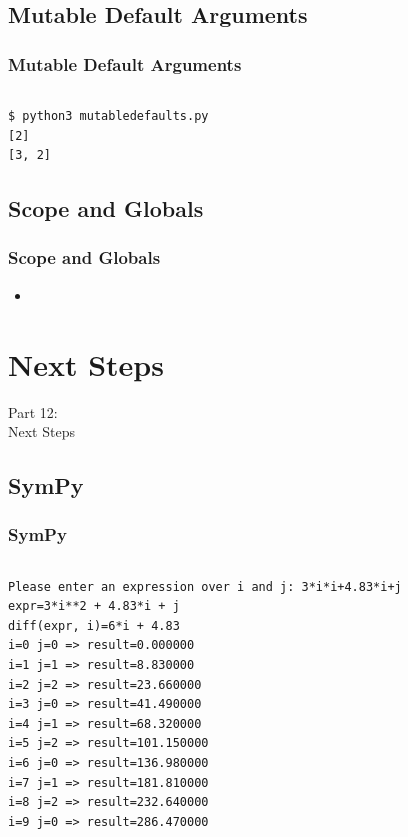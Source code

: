 \subsection{Mutable Default Arguments}
\begin{frame}[fragile]
    \frametitle{Mutable Default Arguments}
    \vspace{3mm}
    \inputminted[fontsize=\normalsize]{python}{../src/mutabledefaults.py}
    \pause
    \vspace{5mm}
    \begin{verbatim}
$ python3 mutabledefaults.py 
[2]
[3, 2]
    \end{verbatim}
\end{frame}

\subsection{Scope and Globals}
\begin{frame}
    \frametitle{Scope and Globals}
    \vspace{5mm}
    
    \begin{itemize}
      \item 
    \end{itemize}
\end{frame}


\section{Next Steps}
\begin{frame}
    \vspace{25mm}
    \begin{center}
        \Huge{Part 12:\\Next Steps}
    \end{center}
\end{frame}

\subsection{SymPy}
\begin{frame}[fragile]
    \frametitle{SymPy}
    \vspace{2mm}
    \inputminted[fontsize=\tiny]{python}{../src/sympyexample.py}
    \pause
    \vspace{5mm}
    
    {\tiny
    \begin{verbatim}
Please enter an expression over i and j: 3*i*i+4.83*i+j 
expr=3*i**2 + 4.83*i + j
diff(expr, i)=6*i + 4.83
i=0 j=0 => result=0.000000
i=1 j=1 => result=8.830000
i=2 j=2 => result=23.660000
i=3 j=0 => result=41.490000
i=4 j=1 => result=68.320000
i=5 j=2 => result=101.150000
i=6 j=0 => result=136.980000
i=7 j=1 => result=181.810000
i=8 j=2 => result=232.640000
i=9 j=0 => result=286.470000
    \end{verbatim}
    }
\end{frame}


